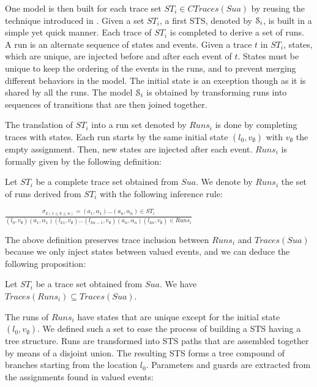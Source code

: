One model is then built for each trace set $ST_i \in
CTraces(Sua)$ by reusing the technique introduced in
. Given a set
$ST_i$, a first STS, denoted by $\EuScript{S}_i$, is built in a
simple yet quick manner. Each trace of $ST_i$ is completed to
derive a set of runs. A run is an alternate sequence of states
and events. Given a trace $t$ in $ST_i$, states, which are
unique, are injected before and after each event of $t$. States
must be unique to keep the ordering of the events in the runs,
and to prevent merging different behaviors in the model.  The
initial state is an exception though as it is shared by all the
runs. The model $\EuScript{S}_i$ is obtained by transforming runs
into sequences of transitions that are then joined together.

The translation of $ST_i$ into a run set denoted by $Runs_i$ is done
by completing traces with states. Each run starts by the same
initial state $(l_0,v_\emptyset)$ with $v_\emptyset$ the empty
assignment. Then, new states are injected after each event.
$Runs_i$ is formally given by the following definition:

\begin{definition}
  Let $ST_i$ be a complete trace set obtained from
  $\mathit{Sua}$. We denote by $Runs_i$ the set of runs derived from
  $ST_i$ with the following inference rule:

  \begin{center}
    {\Large
    $\frac{\sigma_{k(1\leq k \leq n)}=(a_1,\alpha_1)...(a_n,\alpha_n) \in ST_i}
    {(l_0,v_\emptyset) (a_1,\alpha_1) (l_{k1},v_\emptyset) \dots (l_{kn-1},v_\emptyset) (a_n,\alpha_n) (l_{kn},v_\emptyset) \in Runs_i}$
    }
  \end{center}
\end{definition}

The above definition preserves trace inclusion \cite{petrenko06}
between $Runs_i$ and $Traces(Sua)$ because we only inject states
between valued events, and we can deduce the following
proposition:

\begin{proposition}
Let $ST_i$ be a trace set obtained from $\mathit{Sua}$. We have
$Traces(Runs_i) \subseteq Traces(Sua)$.
\end{proposition}

The runs of $Runs_i$ have states that are unique except for the
initial state $(l_0,v_\emptyset)$. We defined such a set to
ease the process of building a STS having a tree structure.  Runs
are transformed into STS paths that are assembled together by
means of a disjoint union. The resulting STS forms a tree
compound of branches starting from the location $l_0$. Parameters
and guards are extracted from the assignments found in valued
events:

